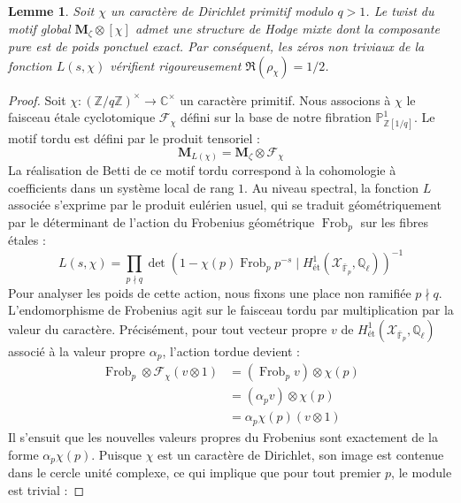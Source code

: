 \documentclass[
]{article}
\newtheorem{lemma}{Lemme}
\begin{document}
\begin{lemma}
Soit $\chi$ un caractère de Dirichlet primitif modulo $q > 1$. Le twist du motif global $\mathbf{M}_{\zeta} \otimes [\chi]$ admet une structure de Hodge mixte dont la composante pure est de poids ponctuel exact. Par conséquent, les zéros non triviaux de la fonction $L(s, \chi)$ vérifient rigoureusement $\Re(\rho_{\chi}) = 1/2$.
\end{lemma}

\begin{proof}
Soit $\chi : (\mathbb{Z}/q\mathbb{Z})^{\times} \to \mathbb{C}^{\times}$ un caractère primitif. Nous associons à $\chi$ le faisceau étale cyclotomique $\mathcal{F}_{\chi}$ défini sur la base de notre fibration $\mathbb{P}^1_{\mathbb{Z}[1/q]}$. Le motif tordu est défini par le produit tensoriel :
\begin{equation*}
\mathbf{M}_{L(\chi)} = \mathbf{M}_{\zeta} \otimes \mathcal{F}_{\chi}
\end{equation*}
La réalisation de Betti de ce motif tordu correspond à la cohomologie à coefficients dans un système local de rang $1$. Au niveau spectral, la fonction $L$ associée s'exprime par le produit eulérien usuel, qui se traduit géométriquement par le déterminant de l'action du Frobenius géométrique $\operatorname{Frob}_p$ sur les fibres étales :
\begin{equation*}
L(s, \chi) = \prod_{p \nmid q} \det\left(1 - \chi(p) \operatorname{Frob}_p p^{-s} \mid H^1_{\text{ét}}(\mathcal{X}_{\bar{\mathbb{F}}_p}, \mathbb{Q}_{\ell}) \right)^{-1}
\end{equation*}
Pour analyser les poids de cette action, nous fixons une place non ramifiée $p \nmid q$. L'endomorphisme de Frobenius agit sur le faisceau tordu par multiplication par la valeur du caractère. Précisément, pour tout vecteur propre $v$ de $H^1_{\text{ét}}(\mathcal{X}_{\bar{\mathbb{F}}_p}, \mathbb{Q}_{\ell})$ associé à la valeur propre $\alpha_p$, l'action tordue devient :
\begin{align*}
\operatorname{Frob}_p \otimes \mathcal{F}_{\chi} (v \otimes 1) &= (\operatorname{Frob}_p v) \otimes \chi(p) \\
&= (\alpha_p v) \otimes \chi(p) \\
&= \alpha_p \chi(p) (v \otimes 1)
\end{align*}
Il s'ensuit que les nouvelles valeurs propres du Frobenius sont exactement de la forme $\alpha_p \chi(p)$. Puisque $\chi$ est un caractère de Dirichlet, son image est contenue dans le cercle unité complexe, ce qui implique que pour tout premier $p$, le module est trivial :

\end{proof}
\end{document}
